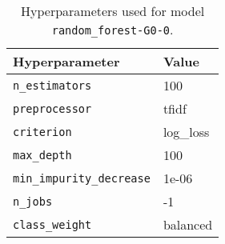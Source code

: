 \begin{table}[H]
\centering
\capstart
\begin{tabularx}{0.48\textwidth}{|X|l|}
\hline
Hyperparameter & Value \\
\hline
\texttt{n\_estimators} & 100 \\
\texttt{preprocessor} & tfidf \\
\texttt{criterion} & log\_loss \\
\texttt{max\_depth} & 100 \\
\texttt{min\_impurity\_decrease} & 1e-06 \\
\texttt{n\_jobs} & -1 \\
\texttt{class\_weight} & balanced \\
\hline
\end{tabularx}
\caption{Hyperparameters used for model \texttt{random\_forest-G0-0}.}
\label{tab:hyperparameters_best_random_forest}

\end{table}
